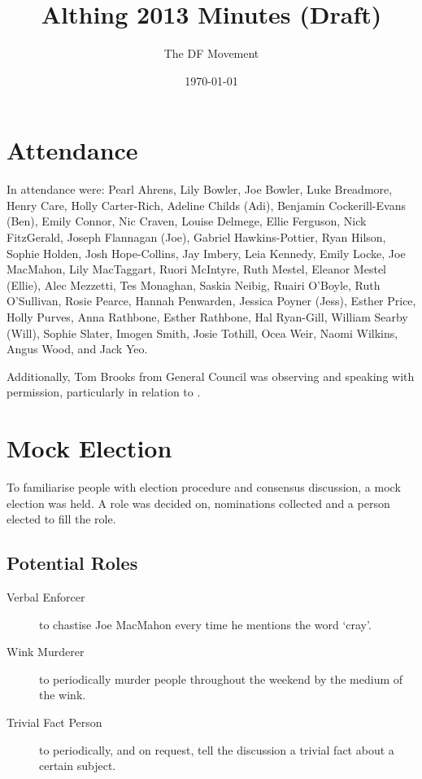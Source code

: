 \documentclass[a4paper, 11pt]{article} %
\title{Althing 2013 Minutes (Draft)}
\author{The DF Movement}
\date{\today}
\begin{document}
\maketitle

\tableofcontents

\section{Attendance}

In attendance were:
Pearl Ahrens,
Lily Bowler,
Joe Bowler,
Luke Breadmore,
Henry Care,
Holly Carter-Rich,
Adeline Childs (Adi),
Benjamin Cockerill-Evans (Ben),
Emily Connor,
Nic Craven,
Louise Delmege,
Ellie Ferguson,
Nick FitzGerald,
Joseph Flannagan (Joe),
Gabriel Hawkins-Pottier,
Ryan Hilson,
Sophie Holden,
Josh Hope-Collins,
Jay Imbery,
Leia Kennedy,
Emily Locke,
Joe MacMahon,
Lily MacTaggart,
Ruori McIntyre,
Ruth Mestel,
Eleanor Mestel (Ellie),
Alec Mezzetti,
Tes Monaghan,
Saskia Neibig,
Ruairi O'Boyle,
Ruth O'Sullivan,
Rosie Pearce,
Hannah Penwarden,
Jessica Poyner (Jess),
Esther Price,
Holly Purves,
Anna Rathbone,
Esther Rathbone,
Hal Ryan-Gill,
William Searby (Will),
Sophie Slater,
Imogen Smith,
Josie Tothill,
Ocea Weir,
Naomi Wilkins,
Angus Wood,
and Jack Yeo.

Additionally, Tom Brooks from General Council was observing and speaking with permission, particularly in relation to .

\section{Mock Election}
To familiarise people with election procedure and consensus discussion, a mock election was held.  A role was decided on, nominations collected and a person elected to fill the role.

\subsection{Potential Roles}
\begin{description}
\item[Verbal Enforcer] to chastise Joe MacMahon every time he mentions the word `cray'.
\item[Wink Murderer] to periodically murder people throughout the weekend by the medium of the wink.
\item[Trivial Fact Person] to periodically, and on request, tell the discussion a trivial fact about a certain subject.
\end{description}
\end{document}
